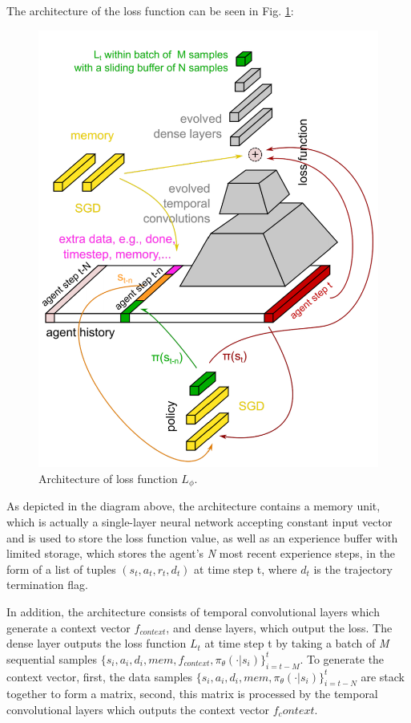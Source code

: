 \par
The architecture of the loss function can be seen in Fig. \ref{loss-architecture}:
\begin{figure}
	\includegraphics[scale=0.5]{loss-architecture.png}
	\centering
	\caption{Architecture of loss function $L_\phi$.}
	\label{loss-architecture}
\end{figure}

\par
As depicted in the diagram above, the architecture contains a memory unit, which is actually a single-layer neural network accepting constant input vector and is used to store the loss function value, as well as an experience buffer with limited storage, which stores the agent's \textit{N} most recent experience steps, in the form of a list of tuples $(s_t,a_t,r_t,d_t)$ at time step t, where \textit{$d_t$} is the trajectory termination flag.

\par
In addition, the architecture consists of temporal convolutional layers which generate a context vector $f_{context}$, and dense layers, which output the loss. The dense layer outputs the loss function \textit{$L_t$} at time step t by taking a batch of \textit{M} sequential samples $\{{s_i,a_i,d_i},mem,f_{context},\pi_\theta(\cdot|s_i)\}^t_{i=t-M}$. To generate the context vector, first, the data samples $\{{s_i,a_i,d_i},mem,\pi_\theta(\cdot|s_i)\}^t_{i=t-N}$ are stack together to form a matrix, second, this matrix is processed by the temporal convolutional layers which outputs the context vector $f_context$.

